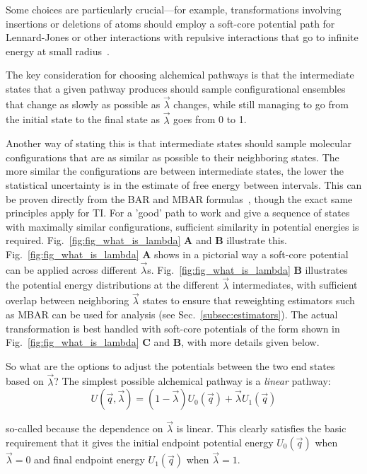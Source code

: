 \documentclass[9pt,bestpractices]{livecoms}
\begin{document}
Some choices are particularly crucial---for example, transformations involving insertions or deletions of atoms should employ a soft-core potential path for Lennard-Jones or other interactions with repulsive interactions that go to infinite energy at small radius~\cite{beutler1994avoiding, beutler1994molecular,gapsys2012new}.

The key consideration for choosing alchemical pathways is that the intermediate states that a given pathway produces should sample configurational ensembles that change as slowly as possible as $\vec{\lambda}$ changes, while still managing to go from the initial state to the final state as $\vec{\lambda}$ goes from 0 to 1.

Another way of stating this is that intermediate states should sample molecular configurations that are as similar as possible to their neighboring states. The more similar the configurations are between intermediate states, the lower the statistical uncertainty is in the estimate of free energy between intervals. This can be proven directly from the BAR and MBAR formulas~\cite{bennett1976efficient,klimovich2015guidelines}, though the exact same principles apply for TI. For a 'good' path to work and give a sequence of states with maximally similar configurations, sufficient similarity in potential energies is required. Fig.~\ref{fig:fig_what_is_lambda} \textbf{A} and \textbf{B} illustrate this. Fig.~\ref{fig:fig_what_is_lambda} \textbf{A} shows in a pictorial way a soft-core potential can be applied across different $\vec{\lambda}$s. Fig.~\ref{fig:fig_what_is_lambda} \textbf{B} illustrates the potential energy distributions at the different $\vec{\lambda}$ intermediates, with sufficient overlap between neighboring $\vec{\lambda}$ states to ensure that reweighting estimators such as MBAR can be used for analysis (see Sec.~\ref{subsec:estimators}). The actual transformation is best handled with soft-core potentials of the form shown in Fig.~\ref{fig:fig_what_is_lambda} \textbf{C} and \textbf{B}, with more details given below. 

So what are the options to adjust the potentials between the two end states based on $\vec{\lambda}$? The simplest possible alchemical pathway is a \textit{linear} pathway:
\begin{equation}
U(\vec{q},\vec{\lambda}) = (1-\vec{\lambda}) U_0(\vec{q}) + \vec{\lambda}U_1(\vec{q}) \end{equation}

so-called because the dependence on $\vec{\lambda}$ is linear. This clearly satisfies the basic requirement that it gives the initial endpoint potential energy $U_0(\vec{q})$ when $\vec{\lambda}=0$ and final endpoint energy $U_1(\vec{q})$ when $\vec{\lambda}=1$. 
\end{document}
